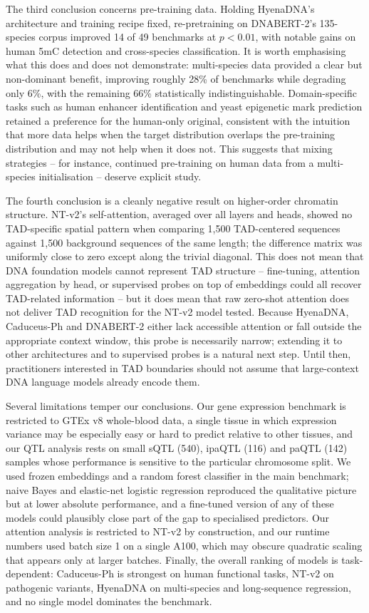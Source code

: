 \documentclass[11pt,a4paper]{article}
\begin{document}
The third conclusion concerns pre-training data. Holding HyenaDNA's architecture and training recipe fixed, re-pretraining on DNABERT-2's 135-species corpus improved 14 of 49 benchmarks at $p < 0.01$, with notable gains on human 5mC detection and cross-species classification. It is worth emphasising what this does and does not demonstrate: multi-species data provided a clear but non-dominant benefit, improving roughly 28\% of benchmarks while degrading only 6\%, with the remaining 66\% statistically indistinguishable. Domain-specific tasks such as human enhancer identification and yeast epigenetic mark prediction retained a preference for the human-only original, consistent with the intuition that more data helps when the target distribution overlaps the pre-training distribution and may not help when it does not. This suggests that mixing strategies -- for instance, continued pre-training on human data from a multi-species initialisation -- deserve explicit study.

The fourth conclusion is a cleanly negative result on higher-order chromatin structure. NT-v2's self-attention, averaged over all layers and heads, showed no TAD-specific spatial pattern when comparing 1{,}500 TAD-centered sequences against 1{,}500 background sequences of the same length; the difference matrix was uniformly close to zero except along the trivial diagonal. This does not mean that DNA foundation models cannot represent TAD structure -- fine-tuning, attention aggregation by head, or supervised probes on top of embeddings could all recover TAD-related information -- but it does mean that raw zero-shot attention does not deliver TAD recognition for the NT-v2 model tested. Because HyenaDNA, Caduceus-Ph and DNABERT-2 either lack accessible attention or fall outside the appropriate context window, this probe is necessarily narrow; extending it to other architectures and to supervised probes is a natural next step. Until then, practitioners interested in TAD boundaries should not assume that large-context DNA language models already encode them.

Several limitations temper our conclusions. Our gene expression benchmark is restricted to GTEx v8 whole-blood data, a single tissue in which expression variance may be especially easy or hard to predict relative to other tissues, and our QTL analysis rests on small sQTL (540), ipaQTL (116) and paQTL (142) samples whose performance is sensitive to the particular chromosome split. We used frozen embeddings and a random forest classifier in the main benchmark; naive Bayes and elastic-net logistic regression reproduced the qualitative picture but at lower absolute performance, and a fine-tuned version of any of these models could plausibly close part of the gap to specialised predictors. Our attention analysis is restricted to NT-v2 by construction, and our runtime numbers used batch size 1 on a single A100, which may obscure quadratic scaling that appears only at larger batches. Finally, the overall ranking of models is task-dependent: Caduceus-Ph is strongest on human functional tasks, NT-v2 on pathogenic variants, HyenaDNA on multi-species and long-sequence regression, and no single model dominates the benchmark.
\end{document}
